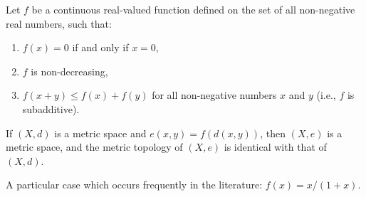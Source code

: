 Let $f$ be a continuous real-valued function defined on the set of all non-negative real numbers, such that:
\begin{enumerate}
\item $f(x) = 0$ if and only if $x = 0$,
\item $f$ is non-decreasing,
\item $f(x + y) \leq f(x) + f(y)$ for all non-negative numbers $x$ and $y$ (i.e., $f$ is subadditive).
\end{enumerate}
If $(X, d)$ is a metric space and $e(x, y) = f(d(x, y))$, then $(X, e)$ is a metric space, and the metric topology of $(X, e)$ is identical with that of $(X, d)$.

A particular case which occurs frequently in the literature: $f(x) = x / (1 + x)$.
